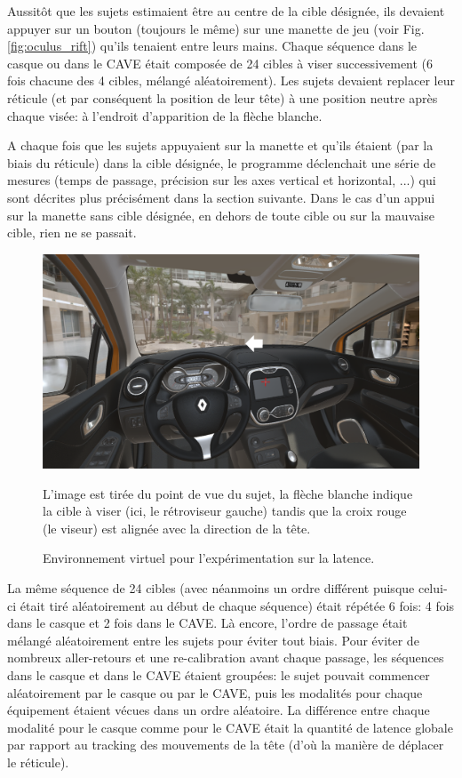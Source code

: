 	\par Aussitôt que les sujets estimaient être au centre de la cible désignée, ils devaient appuyer sur un bouton (toujours le même) sur une manette de jeu (voir Fig. \ref{fig:oculus_rift}) qu'ils tenaient entre leurs mains. Chaque séquence dans le casque ou dans le CAVE était composée de 24 cibles à viser successivement (6 fois chacune des 4 cibles, mélangé aléatoirement). Les sujets devaient replacer leur réticule (et par conséquent la position de leur tête) à une position neutre après chaque visée: à l'endroit d'apparition de la flèche blanche.
	
	\par A chaque fois que les sujets appuyaient sur la manette et qu'ils étaient (par la biais du réticule) dans la cible désignée, le programme déclenchait une série de mesures (temps de passage, précision sur les axes vertical et horizontal, ...) qui sont décrites plus précisément dans la section suivante. Dans le cas d'un appui sur la manette sans cible désignée, en dehors de toute cible ou sur la mauvaise cible, rien ne se passait.
	
	\begin{figure}
		\centering
		\includegraphics[scale=.9]{Figures/ExpeLatency}
		\caption{Environnement virtuel pour l'expérimentation sur la latence.}{L'image est tirée du point de vue du sujet, la flèche blanche indique la cible à viser (ici, le rétroviseur gauche) tandis que la croix rouge (le viseur) est alignée avec la direction de la tête.}
		\label{fig:apparatus_latency}
	\end{figure}
	
	\par La même séquence de 24 cibles (avec néanmoins un ordre différent puisque celui-ci était tiré aléatoirement au début de chaque séquence) était répétée 6 fois: 4 fois dans le casque et 2 fois dans le CAVE. Là encore, l'ordre de passage était mélangé aléatoirement entre les sujets pour éviter tout biais. Pour éviter de nombreux aller-retours et une re-calibration avant chaque passage, les séquences dans le casque et dans le CAVE étaient groupées: le sujet pouvait commencer aléatoirement par le casque ou par le CAVE, puis les modalités pour chaque équipement étaient vécues dans un ordre aléatoire. La différence entre chaque modalité pour le casque comme pour le CAVE était la quantité de latence globale par rapport au tracking des mouvements de la tête (d'où la manière de déplacer le réticule).
	
